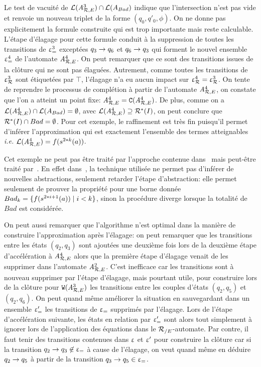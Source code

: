 Le test de vacuité de $\mathcal{L}({\mathit A}_{\mathcal R,E}^3) \cap \mathcal{L}(A_{Bad})$ indique
que l'intersection n'est pas vide et renvoie un nouveau triplet de la forme $(q_0,q'_0,\phi)$.
On ne donne pas explicitement la formule construite qui est trop importante
mais reste calculable. L'étape d'élagage pour cette formule conduit à
la suppression de toutes les transitions de $\upvarepsilon_{=}^3$ exceptées 
$q_3\rightarrow q_6$ et $q_6\rightarrow q_3$ qui forment le nouvel ensemble $\upvarepsilon_{=}^4$
de l'automate ${\mathit A}_{\mathcal R,E}^4$. On peut remarquer que ce sont des transitions 
issues de la clôture qui ne sont pas élaguées.
Autrement, comme toutes les transitions de $\upvarepsilon_{\mathcal R}^3$ 
sont étiquetées par $\top$, l'élagage n'a eu aucun impact sur $\upvarepsilon_{\mathcal R}^4 = \upvarepsilon_{\mathcal R}^3$.
On tente de reprendre le processus de complétion à partir de l'automate ${\mathit A}_{\mathcal R,E}^4$,
on constate que l'on a atteint  un point fixe: ${\mathit A}_{\mathcal R,E}^4=\mathtt{C}({\mathit A}_{\mathcal R,E}^4)$. 
De plus, comme on a $\mathcal{L}({\mathit A}_{\mathcal R,E}^4)\cap \mathcal{L}(A_{Bad})=\emptyset$,
avec $\mathcal{L}({\mathit A}_{\mathcal R,E}^4) \supseteq \mathcal R^*(I)$, on peut conclure que 
$\mathcal R^*(I) \cap Bad=\emptyset$. Pour cet exemple, le raffinement est très fin
puisqu'il permet d'inférer l'approximation qui est exactement l'ensemble
des termes atteignables \textit{i.e.}  $\mathcal{L}({\mathit A}_{\mathcal R,E}^4)=f(s^{2*k}(a))$.

\begin{remark}
Cet exemple ne peut pas être traité par l'approche contenue dans~\cite{BCHK08} mais peut-être traité
par~\cite{BouajjaniHRV-SAS06}. En effet dans~\cite{BCHK08}, la technique utilisée ne permet
pas d'inférer de nouvelles abstractions, seulement retarder l'étape d'abstraction:
elle permet seulement de prouver la propriété pour une borne donnée $Bad_k = \{ f(s^{2*i +1}(a)) \; | \; i < k\}$,
sinon la procédure diverge lorsque la totalité de $Bad$ est considérée.
\end{remark}

\begin{remark}
  On peut aussi remarquer que l'algorithme n'est optimal dans la manière de construire l'approximation après 
  l'élagage: on peut remarquer que les transitions entre les états $(q_2, q_3)$ sont ajoutées une deuxième fois
  lors de la deuxième étape d'accélération à ${\mathit A}_{\mathcal R,E}^4$ alors que la première étape d'élagage venait de les supprimer
  dans l'automate ${\mathit A}_{\mathcal R,E}^2$. C'est inefficace car les transitions sont à nouveau supprimer par l'étape d'élagage, mais
  pourtant utile, pour construire lors de la clôture pour $\mathtt{W}({\mathit A}_{\mathcal R,E}^3)$ les transitions entre les couples d'états
  $(q_2,q_5)$ et $(q_2,q_6)$. On peut quand même améliorer la situation en sauvegardant dans un ensemble $\upvarepsilon_{=}'$ les transitions
  de $\upvarepsilon_{=}$ supprimés par l'élagage. Lors de l'étape d'accélération suivante, les états en relation par $\upvarepsilon_{=}'$ sont alors 
  tout simplement à ignorer lors de l'application des équations dans le ${\mathcal R_{/E}}$-automate. Par contre, il faut tenir
  des transitions contenues dans $\upvarepsilon$ et $\upvarepsilon'$ pour construire la clôture car si la transition $q_2 \rightarrow q_3 \not\in \upvarepsilon_{=}$
  à cause de l'élagage, on veut quand même en déduire $q_2 \rightarrow q_5$ à partir de la transition $q_3 \rightarrow q_5 \in \upvarepsilon_{=}$.
\end{remark}

